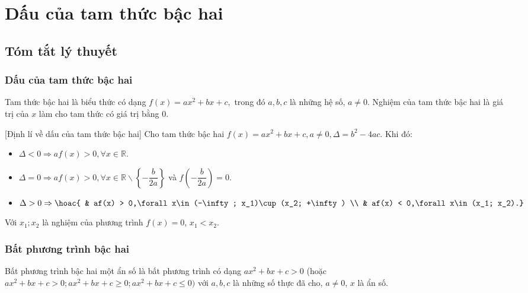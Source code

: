 \setcounter{dang}{0}
\setcounter{section}{2}
\section{Dấu của tam thức bậc hai}
\subsection{Tóm tắt lý thuyết}
	\subsubsection{Dấu của tam thức bậc hai}
	\begin{dn}{}
	Tam thức bậc hai là biểu thức có dạng $f(x) = ax^2 + bx + c,$ trong đó $a,b,c$ là những hệ số, $a\ne 0$. Nghiệm của tam thức bậc hai là giá trị của $x$ làm cho tam thức có giá trị bằng $0$.
	\end{dn}
	\begin{dl}{[Định lí về dấu của tam thức bậc hai]}
	Cho tam thức bậc hai $f(x) = ax^2 + bx + c,a\ne 0,\Delta = b^2 - 4ac$.
	Khi đó:
	\begin{itemize}
	\item $\Delta < 0\Rightarrow af(x) > 0,\forall x\in \mathbb{R}$.
	\item $ \Delta = 0\Rightarrow af(x) > 0,\forall x\in \mathbb{R}\backslash \left\{ - \dfrac{b}{2a}\right\} $ và $f\left(-\dfrac{b}{2a}\right)=0$.
	\item $ \Delta > 0\Rightarrow \hoac{
	& af(x) > 0,\forall x\in (-\infty; x_1)\cup (x_2; +\infty) \\ 
	& af(x) < 0,\forall x\in (x_1; x_2).}$
	\end{itemize}
	Với $x_1;x_2$ là nghiệm của phương trình $f(x) = 0$, $x_1 < x_2$.
	\end{dl}
	\subsubsection{Bất phương trình bậc hai}
	\begin{dn}{}
	Bất phương trình bậc hai một ẩn số là bất phương trình có dạng $ax^2 + bx + c > 0$ (hoặc $ax^2 + bx + c > 0; ax^2 + bx + c\ge 0; ax^2 + bx + c\le 0)$ với $a,b,c$ là những số thực đã cho, $a\ne 0$, $x$ là ẩn số.
	\end{dn}
